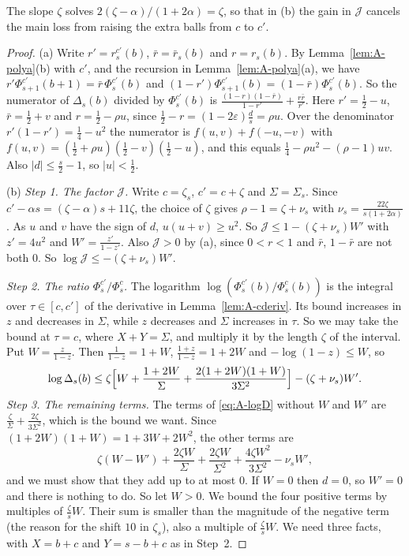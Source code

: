 The slope $\zeta$ solves $2(\zeta-\alpha)/(1+2\alpha)=\zeta$, so that in (b)
the gain in $\mathcal J$ cancels the main loss from raising the extra balls
from $c$ to $c'$.

\begin{proof}
(a) Write $r'=r^{c'}_s(b)$, $\bar r=\bar r_s(b)$ and $r=r_s(b)$. By
Lemma~\ref{lem:A-polya}(b) with $c'$, and the recursion in
Lemma~\ref{lem:A-polya}(a), we have
$r'\Phi^{c'}_{s+1}(b+1)=\bar r\,\Phi^{c'}_s(b)$ and
$(1-r')\Phi^{c'}_{s+1}(b)=(1-\bar r)\Phi^{c'}_s(b)$. So the numerator of
$\Delta_s(b)$ divided by $\Phi^{c'}_s(b)$ is
$\frac{(1-r)(1-\bar r)}{1-r'}+\frac{r\bar r}{r'}$. Here $r'=\frac12-u$,
$\bar r=\frac12+v$ and $r=\frac12-\rho u$, since
$\frac12-r=(1-2\varepsilon)\frac ds=\rho u$. Over the denominator
$r'(1-r')=\frac14-u^2$ the numerator is $f(u,v)+f(-u,-v)$ with
$f(u,v)=(\frac12+\rho u)(\frac12-v)(\frac12-u)$, and this equals
$\frac14-\rho u^2-(\rho-1)uv$. Also $|d|\le\frac s2-1$, so $|u|<\frac12$.

(b) \emph{Step 1. The factor $\mathcal J$.} Write $c=\zeta_s$,
$c'=c+\zeta$ and $\Sigma=\Sigma_s$. Since
$c'-\alpha s=(\zeta-\alpha)s+11\zeta$, the choice of $\zeta$ gives
$\rho-1=\zeta+\nu_s$ with $\nu_s=\frac{22\zeta}{s(1+2\alpha)}$. As $u$ and
$v$ have the sign of $d$, $u(u+v)\ge u^2$. So
$\mathcal J\le1-(\zeta+\nu_s)W'$ with $z'=4u^2$ and $W'=\frac{z'}{1-z'}$.
Also $\mathcal J>0$ by (a), since $0<r<1$ and $\bar r$, $1-\bar r$ are not
both $0$. So $\log\mathcal J\le-(\zeta+\nu_s)W'$.

\emph{Step 2. The ratio $\Phi^{c'}_s/\Phi^c_s$.} The logarithm
$\log(\Phi^{c'}_s(b)/\Phi^c_s(b))$ is the integral over $\tau\in[c,c']$ of
the derivative in Lemma~\ref{lem:A-cderiv}. Its bound increases in $z$ and
decreases in $\Sigma$, while $z$ decreases and $\Sigma$ increases in $\tau$.
So we may take the bound at $\tau=c$, where $X+Y=\Sigma$, and multiply it by
the length $\zeta$ of the interval. Put
$W=\frac z{1-z}$. Then $\frac1{1-z}=1+W$, $\frac{1+z}{1-z}=1+2W$ and
$-\log(1-z)\le W$, so
\begin{equation}\label{eq:A-logD}
 \log \Delta_s(b)\le\zeta\Bigl[W+\frac{1+2W}\Sigma+\frac{2(1+2W)(1+W)}{3\Sigma^2}\Bigr]
 -(\zeta+\nu_s)W'.
\end{equation}
\emph{Step 3. The remaining terms.} The terms of \eqref{eq:A-logD} without
$W$ and $W'$ are $\frac\zeta\Sigma+\frac{2\zeta}{3\Sigma^2}$, which is the
bound we want. Since $(1+2W)(1+W)=1+3W+2W^2$, the other terms are
\[
 \zeta(W-W')+\frac{2\zeta W}\Sigma+\frac{2\zeta W}{\Sigma^2}
 +\frac{4\zeta W^2}{3\Sigma^2}-\nu_sW',
\]
and we must show that they add up to at most $0$. If $W=0$ then $d=0$, so
$W'=0$ and there is nothing to do. So let $W>0$. We bound the four positive terms by multiples of $\frac\zeta sW$. Their sum is smaller than the magnitude of the negative term (the reason for the shift $10$ in $\zeta_s$), also a multiple of $\frac\zeta sW$. We need three facts, with $X=b+c$ and
$Y=s-b+c$ as in Step~2.



\end{proof}
